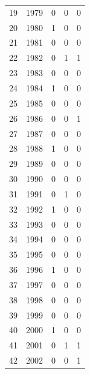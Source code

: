 \documentclass[english, twoside, 12pt, a4paper]{article}
\theoremstyle{definition}
\theoremstyle{plain}
\theoremstyle{remark}
\begin{document}
\begin{longtable}{rrrrr}
  19 & 1979 & 0         & 0      & 0                              \\ 
  20 & 1980 & 1         & 0      & 0                              \\ 
  21 & 1981 & 0         & 0      & 0                              \\ 
  22 & 1982 & 0         & 1      & 1                              \\ 
  23 & 1983 & 0         & 0      & 0                              \\ 
  24 & 1984 & 1         & 0      & 0                              \\ 
  25 & 1985 & 0         & 0      & 0                              \\ 
  26 & 1986 & 0         & 0      & 1                              \\ 
  27 & 1987 & 0         & 0      & 0                              \\ 
  28 & 1988 & 1         & 0      & 0                              \\ 
  29 & 1989 & 0         & 0      & 0                              \\ 
  30 & 1990 & 0         & 0      & 0                              \\ 
  31 & 1991 & 0         & 1      & 0                              \\ 
  32 & 1992 & 1         & 0      & 0                              \\ 
  33 & 1993 & 0         & 0      & 0                              \\ 
  34 & 1994 & 0         & 0      & 0                              \\ 
  35 & 1995 & 0         & 0      & 0                              \\ 
  36 & 1996 & 1         & 0      & 0                              \\ 
  37 & 1997 & 0         & 0      & 0                              \\ 
  38 & 1998 & 0         & 0      & 0                              \\ 
  39 & 1999 & 0         & 0      & 0                              \\ 
  40 & 2000 & 1         & 0      & 0                              \\ 
  41 & 2001 & 0         & 1      & 1                              \\ 
  42 & 2002 & 0         & 0      & 1                              \\ 

\end{longtable}
\end{document}
